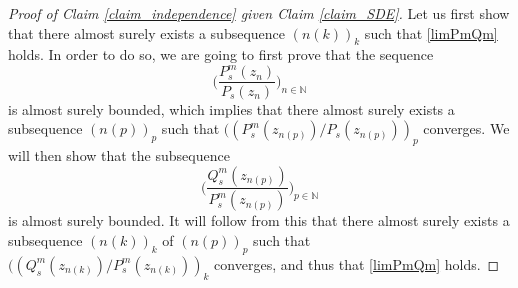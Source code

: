 \documentclass{article}
\theoremstyle{definition}
\theoremstyle{remark}
\theoremstyle{remark}
\begin{document}
\begin{proof}[Proof of Claim \ref{claim_independence} given Claim \ref{claim_SDE}]
Let us first show that there almost surely exists a subsequence $(n(k))_k$ such that \eqref{limPmQm} holds. In order to do so, we are going to first prove that the sequence
\begin{equation*}
    \bigg( \frac{P_s^m(z_n)}{P_s(z_n)} \bigg)_{n \in \mathbb{N}}
\end{equation*}
is almost surely bounded, which implies that there almost surely exists a subsequence $(n(p))_p$ such that $((P_s^m(z_{n(p)})/P_s(z_{n(p)}))_p$ converges. We will then show that the subsequence
\begin{equation*}
     \bigg( \frac{Q_s^m(z_{n(p)})}{P_s^m(z_{n(p)})}\bigg)_{p \in \mathbb{N}}
\end{equation*}
is almost surely bounded. It will follow from this that there almost surely exists a subsequence $(n(k))_k$ of $(n(p))_p$ such that $((Q_s^m(z_{n(k)})/P_s^m(z_{n(k)}))_k$ converges, and thus that \eqref{limPmQm} holds.


\end{proof}
\end{document}
